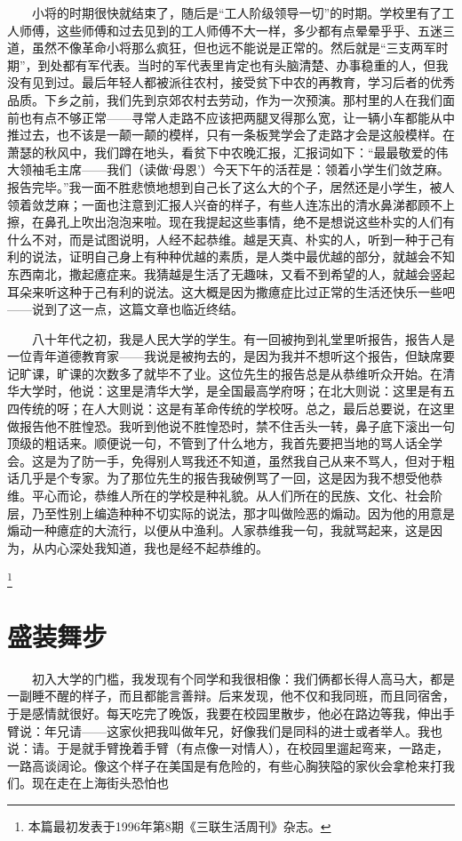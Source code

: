 　　小将的时期很快就结束了，随后是“工人阶级领导一切”的时期。学校里有了工人师傅，这些师傅和过去见到的工人师傅不大一样，多少都有点晕晕乎乎、五迷三道，虽然不像革命小将那么疯狂，但也远不能说是正常的。然后就是“三支两军时期”，到处都有军代表。当时的军代表里肯定也有头脑清楚、办事稳重的人，但我没有见到过。最后年轻人都被派往农村，接受贫下中农的再教育，学习后者的优秀品质。下乡之前，我们先到京郊农村去劳动，作为一次预演。那村里的人在我们面前也有点不够正常——寻常人走路不应该把两腿叉得那么宽，让一辆小车都能从中推过去，也不该是一颠一颠的模样，只有一条板凳学会了走路才会是这般模样。在萧瑟的秋风中，我们蹲在地头，看贫下中农晚汇报，汇报词如下：“最最敬爱的伟大领袖毛主席——我们（读做‘母恩’）今天下午的活茬是：领着小学生们敛芝麻。报告完毕。”我一面不胜悲愤地想到自己长了这么大的个子，居然还是小学生，被人领着敛芝麻；一面也注意到汇报人兴奋的样子，有些人连冻出的清水鼻涕都顾不上擦，在鼻孔上吹出泡泡来啦。现在我提起这些事情，绝不是想说这些朴实的人们有什么不对，而是试图说明，人经不起恭维。越是天真、朴实的人，听到一种于己有利的说法，证明自己身上有种种优越的素质，是人类中最优越的部分，就越会不知东西南北，撒起癔症来。我猜越是生活了无趣味，又看不到希望的人，就越会竖起耳朵来听这种于己有利的说法。这大概是因为撒癔症比过正常的生活还快乐一些吧——说到了这一点，这篇文章也临近终结。

　　八十年代之初，我是人民大学的学生。有一回被拘到礼堂里听报告，报告人是一位青年道德教育家——我说是被拘去的，是因为我并不想听这个报告，但缺席要记旷课，旷课的次数多了就毕不了业。这位先生的报告总是从恭维听众开始。在清华大学时，他说：这里是清华大学，是全国最高学府呀；在北大则说：这里是有五四传统的呀；在人大则说：这是有革命传统的学校呀。总之，最后总要说，在这里做报告他不胜惶恐。我听到他说不胜惶恐时，禁不住舌头一转，鼻子底下滚出一句顶级的粗话来。顺便说一句，不管到了什么地方，我首先要把当地的骂人话全学会。这是为了防一手，免得别人骂我还不知道，虽然我自己从来不骂人，但对于粗话几乎是个专家。为了那位先生的报告我破例骂了一回，这是因为我不想受他恭维。平心而论，恭维人所在的学校是种礼貌。从人们所在的民族、文化、社会阶层，乃至性别上编造种种不切实际的说法，那才叫做险恶的煽动。因为他的用意是煽动一种癔症的大流行，以便从中渔利。人家恭维我一句，我就骂起来，这是因为，从内心深处我知道，我也是经不起恭维的。

\footnote{本篇最初发表于1996年第8期《三联生活周刊》杂志。}

\chapter{盛装舞步}

　　初入大学的门槛，我发现有个同学和我很相像：我们俩都长得人高马大，都是一副睡不醒的样子，而且都能言善辩。后来发现，他不仅和我同班，而且同宿舍，于是感情就很好。每天吃完了晚饭，我要在校园里散步，他必在路边等我，伸出手臂说：年兄请——这家伙把我叫做年兄，好像我们是同科的进士或者举人。我也说：请。于是就手臂挽着手臂（有点像一对情人），在校园里遛起弯来，一路走，一路高谈阔论。像这个样子在美国是有危险的，有些心胸狭隘的家伙会拿枪来打我们。现在走在上海街头恐怕也

